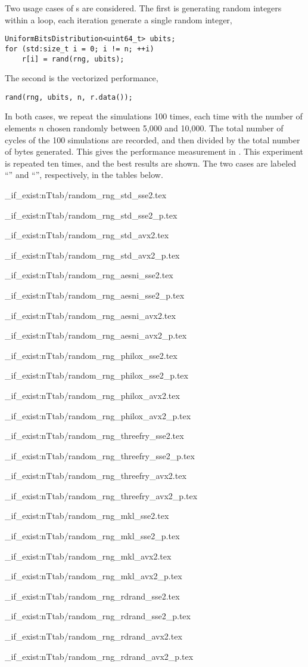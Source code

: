 Two usage cases of \rng{}s are considered. The first is generating random
integers within a loop, each iteration generate a single random integer,
\begin{verbatim}
UniformBitsDistribution<uint64_t> ubits;
for (std:size_t i = 0; i != n; ++i)
    r[i] = rand(rng, ubits);
\end{verbatim}
The second is the vectorized performance,
\begin{verbatim}
rand(rng, ubits, n, r.data());
\end{verbatim}
In both cases, we repeat the simulations 100 times, each time with the number
of elements $n$ chosen randomly between 5,000 and 10,000. The total number of
cycles of the 100 simulations are recorded, and then divided by the total
number of bytes generated. This gives the performance measurement in \cpb. This
experiment is repeated ten times, and the best results are shown. The two cases
are labeled ``\single'' and ``\batch'', respectively, in the tables below.

\ExplSyntaxOn
\def\rngtable#1#2#3{
  \file_if_exist:nT{tab/random_rng_#1_sse2.tex}{
    \begin{table}
      
      \caption{Performance~of~#2~(Nehalem,~sequential)}
      \label{tab:Performance~of~#3~(Nehalem,~sequential)}
    \end{table}
  }
  \file_if_exist:nT{tab/random_rng_#1_sse2_p.tex}{
    \begin{table}
      
      \caption{Performance~of~#2~(Nehalem,~parallel)}
      \label{tab:Performance~of~#3~(Nehalem,~parallel)}
    \end{table}
  }
  \file_if_exist:nT{tab/random_rng_#1_avx2.tex}{
    \begin{table}
      
      \caption{Performance~of~#2~(Haswell,~sequential)}
      \label{tab:Performance~of~#3~(Haswell,~sequential)}
    \end{table}
  }
  \file_if_exist:nT{tab/random_rng_#1_avx2_p.tex}{
    \begin{table}
      
      \caption{Performance~of~#2~(Haswell,~parallel)}
      \label{tab:Performance~of~#3~(Haswell,~parallel)}
    \end{table}
  }
  \clearpage
}
\ExplSyntaxOff

\rngtable{std}{\rng in the standard library}{RNG in the standard library}
\rngtable{aesni}{\protect\texttt{AESNIEngine}}{AESNIEngine}
\rngtable{philox}{\protect\texttt{PhiloxEngine}}{PhiloxEngine}
\rngtable{threefry}{\protect\texttt{ThreefryEngine}}{ThreefryEngine}
\rngtable{mkl}{\mkl \rng}{MKL RNG}
\rngtable{rdrand}{non-deterministic \rng}{non-deterministic RNG}
